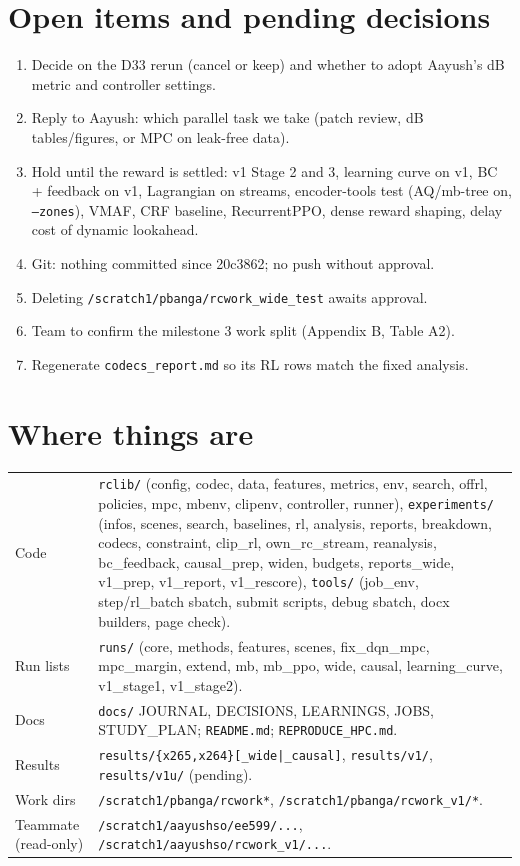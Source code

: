 \documentclass[10pt,a4paper]{article}
\newcommand{\code}[1]{\texttt{\small #1}}
\begin{document}
\section{Open items and pending decisions}
\begin{enumerate}
\item Decide on the D33 rerun (cancel or keep) and whether to adopt Aayush's dB metric and controller settings.
\item Reply to Aayush: which parallel task we take (patch review, dB tables/figures, or MPC on leak-free data).
\item Hold until the reward is settled: v1 Stage 2 and 3, learning curve on v1, BC + feedback on v1, Lagrangian on
streams, encoder-tools test (AQ/mb-tree on, \code{--zones}), VMAF, CRF baseline, RecurrentPPO, dense reward shaping,
delay cost of dynamic lookahead.
\item Git: nothing committed since 20c3862; no push without approval.
\item Deleting \code{/scratch1/pbanga/rcwork\_wide\_test} awaits approval.
\item Team to confirm the milestone 3 work split (Appendix B, Table A2).
\item Regenerate \code{codecs\_report.md} so its RL rows match the fixed analysis.
\end{enumerate}

\appendix
\section{Where things are}
\begin{tabularx}{\linewidth}{lL}
\toprule
Code & \code{rclib/} (config, codec, data, features, metrics, env, search, offrl, policies, mpc, mbenv, clipenv, controller,
runner), \code{experiments/} (infos, scenes, search, baselines, rl, analysis, reports, breakdown, codecs, constraint,
clip\_rl, own\_rc\_stream, reanalysis, bc\_feedback, causal\_prep, widen, budgets, reports\_wide, v1\_prep, v1\_report,
v1\_rescore), \code{tools/} (job\_env, step/rl\_batch sbatch, submit scripts, debug sbatch, docx builders, page check). \\
Run lists & \code{runs/} (core, methods, features, scenes, fix\_dqn\_mpc, mpc\_margin, extend, mb, mb\_ppo, wide, causal,
learning\_curve, v1\_stage1, v1\_stage2). \\
Docs & \code{docs/} JOURNAL, DECISIONS, LEARNINGS, JOBS, STUDY\_PLAN; \code{README.md}; \code{REPRODUCE\_HPC.md}. \\
Results & \code{results/\{x265,x264\}[\_wide|\_causal]}, \code{results/v1/}, \code{results/v1u/} (pending). \\
Work dirs & \code{/scratch1/pbanga/rcwork*}, \code{/scratch1/pbanga/rcwork\_v1/*}. \\
Teammate (read-only) & \code{/scratch1/aayushso/ee599/...}, \code{/scratch1/aayushso/rcwork\_v1/...}. \\
\bottomrule
\end{tabularx}
\end{document}
